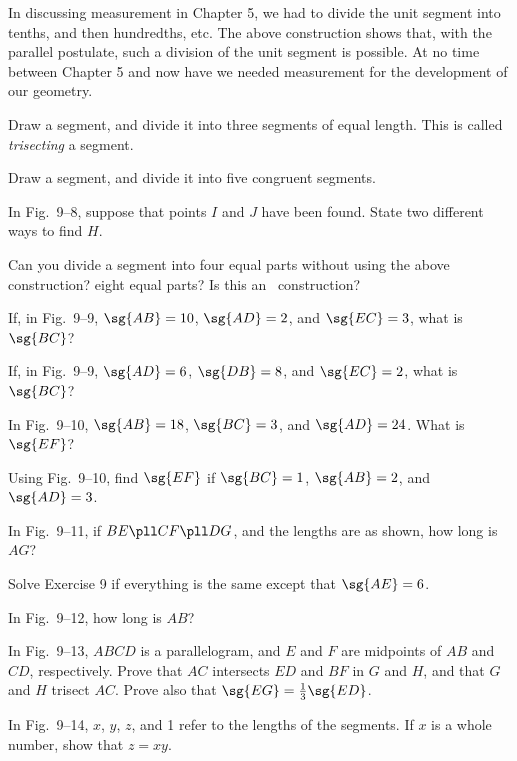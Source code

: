 \documentclass[11pt]{book}
\theoremstyle{bkplain}
\theoremstyle{XIplainnote}
\theoremstyle{bkplain}
\theoremstyle{bkplain}
\begin{document}
\begin{remark}
In discussing measurement in Chapter 5, we had to divide the unit segment into
tenths, and then hundredths, etc. The above construction shows that, with the
parallel postulate, such a division of the unit segment is possible. At no time
between Chapter 5 and now have we needed measurement for the development of our
geometry.
\end{remark}

\begin{exercisecols}
\begin{exlist}
\item Draw a segment, and divide it into three segments of equal length. This is
      called \emph{trisecting} a segment.
\item Draw a segment, and divide it into five congruent segments.
\item In Fig.~9--8, suppose that points $I$ and $J$ have been found. State two
      different ways to find $H$.
\item Can you divide a segment into four equal parts without using the above
      construction? eight equal parts? Is this an \RC\ construction?
\item If, in Fig.~9--9, $\sg{AB} = 10$, $\sg{AD} = 2$, and $\sg{EC} = 3$, what is
      $\sg{BC}$?
\exfig{\FIGIXNINE}
\item If, in Fig.~9--9, $\sg{AD} = 6$, $\sg{DB} = 8$, and $\sg{EC} = 2$, what is
      $\sg{BC}$?
\item In Fig.~9--10, $\sg{AB} = 18$, $\sg{BC} = 3$, and $\sg{AD} = 24$. What is
      $\sg{EF}$?
\exfig{\FIGIXTEN}
\item Using Fig.~9--10, find $\sg{EF}$ if $\sg{BC} = 1$, $\sg{AB} = 2$, and
      $\sg{AD} = 3$.
\item In Fig.~9--11, if $BE \pll CF \pll DG$, and the lengths are as shown, how
      long is $AG$?
\exfig{\FIGIXELEVEN}
\item Solve Exercise 9 if everything is the same except that $\sg{AE} = 6$.
\item In Fig.~9--12, how long is $AB$?
\exfig{\FIGIXTWELVE}
\item[\stex 12.] In Fig.~9--13, $ABCD$ is a parallelogram, and $E$ and $F$ are
      midpoints of $AB$ and $CD$, respectively. Prove that $AC$ intersects $ED$
      and $BF$ in $G$ and $H$, and that $G$ and $H$ trisect $AC$. Prove also that
      $\sg{EG} = \frac{1}{3}\sg{ED}$.
\exfig{\FIGIXTHIRTEEN}
\item[\stex 13.] In Fig.~9--14, $x$, $y$, $z$, and 1 refer to the lengths of the
      segments. If $x$ is a whole number, show that $z = xy$.
\exfig{\FIGIXFOURTEEN}
\end{exlist}
\end{exercisecols}
\end{document}
